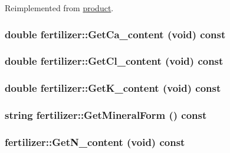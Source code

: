 Reimplemented from \hyperlink{classproduct_a18a1df87f3400774db21d1e8c573f04a}{product}.\hypertarget{classfertilizer_ae3ddec9d6c7c27d2d3174cc7cb8a2703}{
\subsubsection[{GetCa\_\-content}]{\setlength{\rightskip}{0pt plus 5cm}double fertilizer::GetCa\_\-content (void) const}}
\label{classfertilizer_ae3ddec9d6c7c27d2d3174cc7cb8a2703}
\hypertarget{classfertilizer_a847e4854c4fe47fb8fa12cefe700bc2b}{
\subsubsection[{GetCl\_\-content}]{\setlength{\rightskip}{0pt plus 5cm}double fertilizer::GetCl\_\-content (void) const}}
\label{classfertilizer_a847e4854c4fe47fb8fa12cefe700bc2b}
\hypertarget{classfertilizer_a72ac8ceb98ce846dbfc1b7d1d404e9c3}{
\subsubsection[{GetK\_\-content}]{\setlength{\rightskip}{0pt plus 5cm}double fertilizer::GetK\_\-content (void) const}}
\label{classfertilizer_a72ac8ceb98ce846dbfc1b7d1d404e9c3}
\hypertarget{classfertilizer_a69b4d147e3dcf693c48a1b89c0725c51}{
\subsubsection[{GetMineralForm}]{\setlength{\rightskip}{0pt plus 5cm}string fertilizer::GetMineralForm () const}}
\label{classfertilizer_a69b4d147e3dcf693c48a1b89c0725c51}
\hypertarget{classfertilizer_a1b638345af84d6574dd4f9c5524bafc6}{
\subsubsection[{GetN\_\-content}]{ fertilizer::GetN\_\-content (void) const}}
